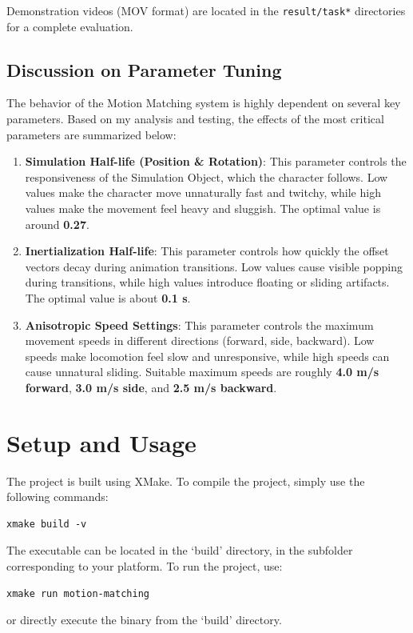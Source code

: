 \documentclass[8pt,a4paper]{extarticle}
\begin{document}
Demonstration videos (MOV format) are located in the \texttt{result/task*} directories for a complete evaluation.

\subsection{Discussion on Parameter Tuning}
The behavior of the Motion Matching system is highly dependent on several key parameters. Based on my analysis and testing, the effects of the most critical parameters are summarized below:

\begin{enumerate}
    \item \textbf{Simulation Half-life (Position \& Rotation)}:
          This parameter controls the responsiveness of the Simulation Object, which the character follows. Low values make the character move unnaturally fast and twitchy, while high values make the movement feel heavy and sluggish. The optimal value is around \textbf{0.27}.

    \item \textbf{Inertialization Half-life}:
          This parameter controls how quickly the offset vectors decay during animation transitions. Low values cause visible popping during transitions, while high values introduce floating or sliding artifacts. The optimal value is about \textbf{0.1 s}.

    \item \textbf{Anisotropic Speed Settings}:
          This parameter controls the maximum movement speeds in different directions (forward, side, backward). Low speeds make locomotion feel slow and unresponsive, while high speeds can cause unnatural sliding. Suitable maximum speeds are roughly \textbf{4.0 m/s forward}, \textbf{3.0 m/s side}, and \textbf{2.5 m/s backward}.
\end{enumerate}


\section{Setup and Usage}

The project is built using XMake. To compile the project, simply use the following commands:
\begin{verbatim}
xmake build -v
\end{verbatim}
The executable can be located in the `build' directory, in the subfolder corresponding to your platform.
To run the project, use:
\begin{verbatim}
xmake run motion-matching
\end{verbatim}
or directly execute the binary from the `build' directory.
\end{document}
